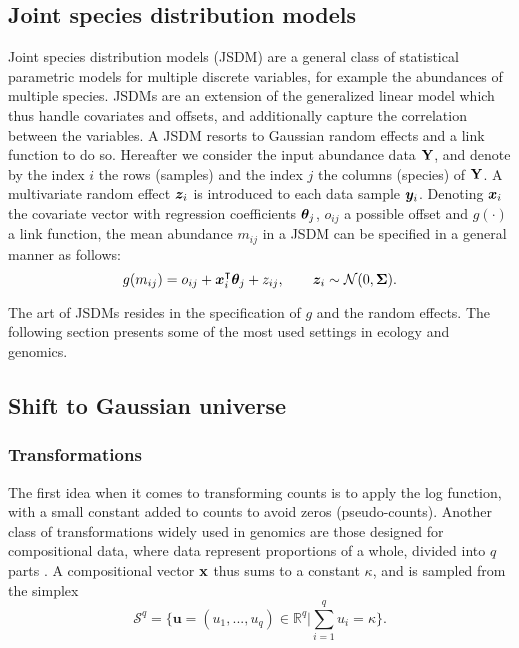   \subsection{Joint species distribution models}
Joint species distribution models (JSDM) are a general class of statistical parametric models for multiple discrete variables, for example the abundances of multiple species. JSDMs are an extension of the generalized linear model which thus  handle covariates and offsets, and additionally capture the correlation between the variables. A JSDM resorts to Gaussian random effects and a link function to do so. Hereafter we consider the input abundance data ${\bf Y}$, and denote by the index $i$ the rows (samples) and the index $j$ the columns (species) of ${\bf Y}$. A multivariate random effect ${\boldsymbol{z}}_i$ is introduced to each data sample ${\boldsymbol{y}}_i$.  Denoting ${\boldsymbol{x}}_i$ the covariate vector with  regression coefficients ${\boldsymbol{\theta}}_j$, $o_{ij}$ a possible offset  and $g(\cdot)$ a link function, the mean abundance $m_{ij}$  in a JSDM can be specified in a general manner as follows:
$$g(m_{ij}) = o_{ij}+{\boldsymbol{x}}_i^\intercal  {\boldsymbol{\theta}}_j + z_{ij}, \qquad {\boldsymbol{z}}_i \sim \mathcal{N}(0, {\boldsymbol{\Sigma}}).$$

The art of JSDMs resides in the specification of $g$ and the random effects. The following section presents some of the most used settings in ecology and genomics.

\subsection{Shift to Gaussian universe} 
\subsubsection{Transformations}
The first idea when it comes to transforming counts is to apply the log function, with a  small constant added to counts to avoid zeros (pseudo-counts). Another class of transformations widely used in genomics are those designed for compositional data, where  data represent proportions of a whole, divided into $q$ parts \citep{A82}. A compositional vector $\bf{x}$ thus sums to a constant $\kappa$, and is sampled from the simplex
$$\mathcal{S}^q = \bigg\{ \boldsymbol{u}=(u_1,...,u_q)\in \mathds{R}^q\bigg\rvert\sum_{i=1}^q u_i = \kappa\bigg\}.$$

